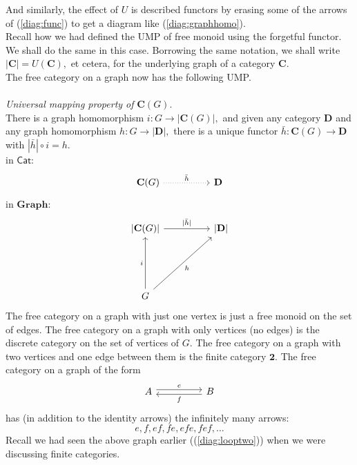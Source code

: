 And similarly, the effect of $U$ is described functors by erasing some of the arrows of (\ref{diag:func}) to get a diagram like (\ref{diag:graphhomo}).\\
Recall how we had defined the UMP of free monoid using the forgetful functor. We shall do the same in this case. Borrowing the same notation, we shall write $|\mathbf{C}| = U(\mathbf{C}),$ et cetera, for the underlying graph of a category $\mathbf{C}.$\\
The free category on a graph now has the following UMP.\\\\
\emph{Universal mapping property of }$\mathbf{C}(G).$\\
There is a graph homomorphism $i:G \to |\mathbf{C}(G)|,$ and given any category $\mathbf{D}$ and any graph homomorphism $h:G \to |\mathbf{D}|,$ there is a unique functor $\bar{h}:\mathbf{C}(G) \to \mathbf{D}$ with $|\bar{h}|\circ i = h.$\\
in $\mathsf{Cat}$:
\begin{equation*} 
	\begin{tikzcd}
		\mathbf{C}(G) \arrow[rr, dotted, "\bar{h}"] && \mathbf{D}
	\end{tikzcd}
\end{equation*}
in $\mathbf{Graph}$:
\begin{equation*} 
	\begin{tikzcd}
	{\vert}\mathbf{C}(G){\vert} \arrow[rr, "{\vert}\bar{h}{\vert}"] &  & {\vert}\mathbf{D}{\vert} \\&  &\\&  &\\
	G \arrow[uuu, "i"] \arrow[rruuu, "h"']&&                        
	\end{tikzcd}
\end{equation*}
\example{} The free category on a graph with just one vertex is just a free monoid on the set of edges. The free category on a graph with only vertices (no edges) is the discrete category on the set of vertices of $G.$ The free category on a graph with two vertices and one edge between them is the finite category $\mathbf{2}.$ The free category on a graph of the form
\begin{equation*} 
	\begin{tikzcd}
		A \arrow[rr, shift left = 1, "e"] && B \arrow[ll, shift left = 1, "f"]
	\end{tikzcd}
\end{equation*}
has (in addition to the identity arrows) the infinitely many arrows:
\begin{equation*} 
	e, f, ef, fe, efe, fef, \ldots
\end{equation*}
Recall we had seen the above graph earlier ((\ref{diag:looptwo})) when we were discussing finite categories.